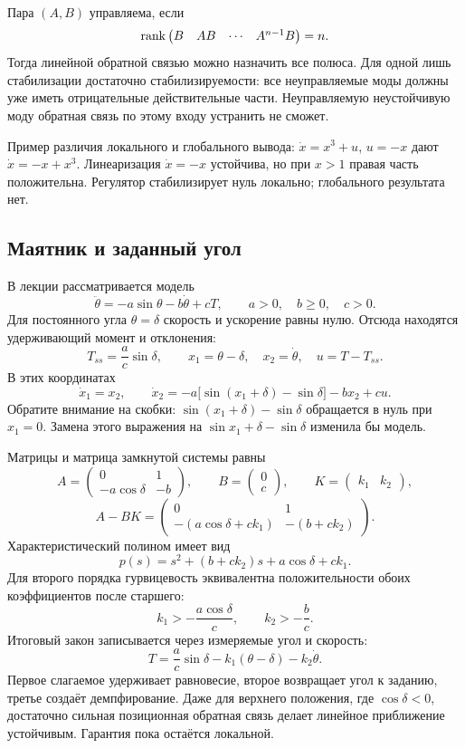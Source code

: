\addition Пара $(A,B)$ управляема, если
\[
  \operatorname{rank}\begin{pmatrix}B&AB&\cdots&A^{n-1}B\end{pmatrix}=n.
\]
Тогда линейной обратной связью можно назначить все полюса. Для одной лишь
стабилизации достаточно стабилизируемости: все неуправляемые моды должны
уже иметь отрицательные действительные части. Неуправляемую неустойчивую
моду обратная связь по этому входу устранить не сможет.

Пример различия локального и глобального вывода:
$\dot x=x^3+u$, $u=-x$ дают $\dot x=-x+x^3$.
Линеаризация $\dot x=-x$ устойчива, но при $x>1$ правая часть положительна.
Регулятор стабилизирует нуль локально; глобального результата нет.

\subsection{Маятник и заданный угол}

В лекции рассматривается модель
\[
  \ddot\theta=-a\sin\theta-b\dot\theta+cT,
  \qquad a>0,\quad b\ge0,\quad c>0.
\]
Для постоянного угла $\theta=\delta$ скорость и ускорение равны нулю.
Отсюда находятся удерживающий момент и отклонения:
\[
  T_{ss}=\frac{a}{c}\sin\delta,\qquad
  x_1=\theta-\delta,\quad x_2=\dot\theta,\quad u=T-T_{ss}.
\]
В этих координатах
\[
  \dot x_1=x_2,\qquad
  \dot x_2=-a\bigl[\sin(x_1+\delta)-\sin\delta\bigr]-bx_2+cu.
\]
Обратите внимание на скобки: $\sin(x_1+\delta)-\sin\delta$ обращается в нуль
при $x_1=0$. Замена этого выражения на $\sin x_1+\delta-\sin\delta$
изменила бы модель.

Матрицы и матрица замкнутой системы равны
\[
  A=\begin{pmatrix}0&1\\-a\cos\delta&-b\end{pmatrix},\qquad
  B=\begin{pmatrix}0\\c\end{pmatrix},\qquad K=\begin{pmatrix}k_1&k_2\end{pmatrix},
\]
\[
  A-BK=\begin{pmatrix}0&1\\-(a\cos\delta+ck_1)&-(b+ck_2)\end{pmatrix}.
\]
Характеристический полином имеет вид
\[
  p(s)=s^2+(b+ck_2)s+a\cos\delta+ck_1.
\]
Для второго порядка гурвицевость эквивалентна положительности обоих
коэффициентов после старшего:
\[
  k_1>-\frac{a\cos\delta}{c},\qquad k_2>-\frac bc.
\]
Итоговый закон записывается через измеряемые угол и скорость:
\begin{equation}
  T=\frac{a}{c}\sin\delta-k_1(\theta-\delta)-k_2\dot\theta.
\end{equation}
Первое слагаемое удерживает равновесие, второе возвращает угол к заданию,
третье создаёт демпфирование. Даже для верхнего положения, где
$\cos\delta<0$, достаточно сильная позиционная обратная связь делает
линейное приближение устойчивым. Гарантия пока остаётся локальной.

